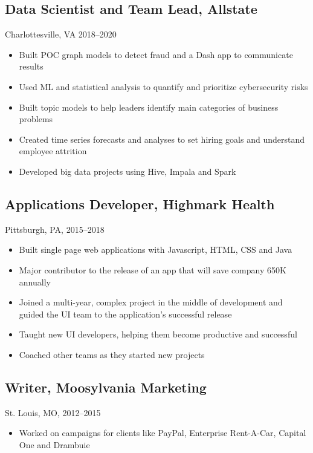\documentclass[11pt]{article}
\begin{document}
	\subsection{\normalsize{Data Scientist and Team Lead, Allstate}}
	{\fontsize{10pt}{\parskip}\selectfont Charlottesville, VA 2018--2020}
	\begin{itemize}
  \item Built POC graph models to detect fraud and a Dash app to communicate results
	\item Used ML and statistical analysis to quantify and prioritize cybersecurity risks
	\item Built topic models to help leaders identify main categories of business problems
	\item Created time series forecasts and analyses to set hiring goals  \newline and understand employee attrition
	\item Developed big data projects using Hive, Impala and Spark
	\end{itemize}

	\subsection{\normalsize{Applications Developer, Highmark Health}}
		{\fontsize{10pt}{\parskip}\selectfont Pittsburgh, PA, 2015--2018}
		\begin{itemize}
		\item Built single page web applications with Javascript, HTML, CSS and Java
		\item Major contributor to the release of an app that will save company 650K annually
		\item Joined a multi-year, complex project in the middle of development and guided the UI team to the application's successful release
		\item Taught new UI developers, helping them become productive and successful
		\item Coached other teams as they started new projects
		\end{itemize}

	\subsection{\normalsize{Writer, Moosylvania Marketing}}
	{\fontsize{10pt}{\parskip}\selectfont St. Louis, MO, 2012--2015}
	\begin{itemize}
		\item Worked on campaigns for clients like PayPal, Enterprise Rent-A-Car, Capital One and Drambuie
	\end{itemize}
\end{document}
